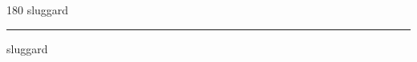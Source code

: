 
\begin{frame}
\begin{center}
\begin{turn}{180}
{\fontsize{2.5cm}{1em}\selectfont sluggard}
\end{turn}
\vspace{1em}\par  
\hrule
\vspace{1em}\par  
{\fontsize{2.5cm}{1em}\selectfont sluggard}
\end{center}
\end{frame}
